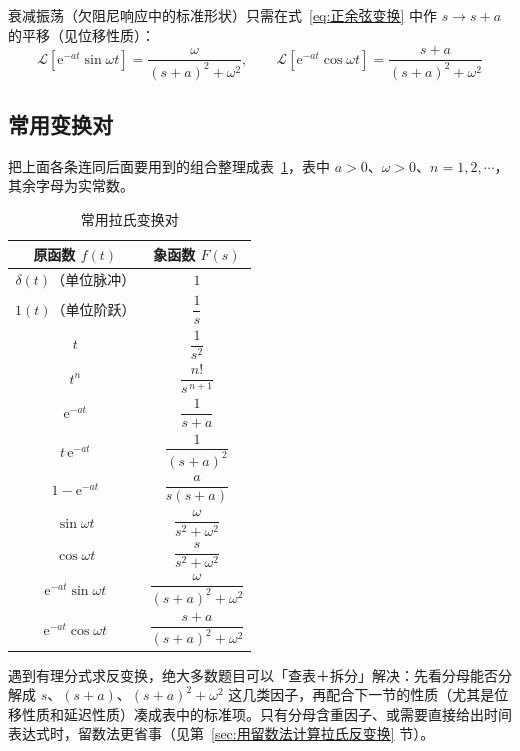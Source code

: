 衰减振荡（欠阻尼响应中的标准形状）只需在式~\eqref{eq:正余弦变换} 中作 $s\to s+a$ 的平移（见位移性质）：
\begin{equation}
\mathcal{L}\left[\mathrm{e}^{-at}\sin\omega t\right]=\frac{\omega}{(s+a)^{2}+\omega^{2}},\qquad
\mathcal{L}\left[\mathrm{e}^{-at}\cos\omega t\right]=\frac{s+a}{(s+a)^{2}+\omega^{2}}
\label{eq:衰减振荡变换}
\end{equation}

\subsection{常用变换对}
\label{sec:常用变换对}

把上面各条连同后面要用到的组合整理成表~\ref{tab:常用拉氏变换对}，表中 $a>0$、$\omega>0$、$n=1,2,\cdots$，其余字母为实常数。

\begin{table}[H]
\centering
\caption{常用拉氏变换对}
\label{tab:常用拉氏变换对}
\renewcommand{\arraystretch}{1.35}
\begin{tabular}{cc}
\toprule
原函数 $f(t)$ & 象函数 $F(s)$ \\
\midrule
$\delta(t)$（单位脉冲） & $1$ \\
$1(t)$（单位阶跃） & $\dfrac{1}{s}$ \\
$t$ & $\dfrac{1}{s^{2}}$ \\
$t^{n}$ & $\dfrac{n!}{s^{\,n+1}}$ \\
$\mathrm{e}^{-at}$ & $\dfrac{1}{s+a}$ \\
$t\,\mathrm{e}^{-at}$ & $\dfrac{1}{(s+a)^{2}}$ \\
$1-\mathrm{e}^{-at}$ & $\dfrac{a}{s(s+a)}$ \\
$\sin\omega t$ & $\dfrac{\omega}{s^{2}+\omega^{2}}$ \\
$\cos\omega t$ & $\dfrac{s}{s^{2}+\omega^{2}}$ \\
$\mathrm{e}^{-at}\sin\omega t$ & $\dfrac{\omega}{(s+a)^{2}+\omega^{2}}$ \\
$\mathrm{e}^{-at}\cos\omega t$ & $\dfrac{s+a}{(s+a)^{2}+\omega^{2}}$ \\
\bottomrule
\end{tabular}
\end{table}

\begin{tipbox}[这张表怎么用]
遇到有理分式求反变换，绝大多数题目可以「查表＋拆分」解决：先看分母能否分解成 $s$、$(s+a)$、$(s+a)^{2}+\omega^{2}$ 这几类因子，再配合下一节的性质（尤其是位移性质和延迟性质）凑成表中的标准项。只有分母含重因子、或需要直接给出时间表达式时，留数法更省事（见第~\ref{sec:用留数法计算拉氏反变换} 节）。
\end{tipbox}

